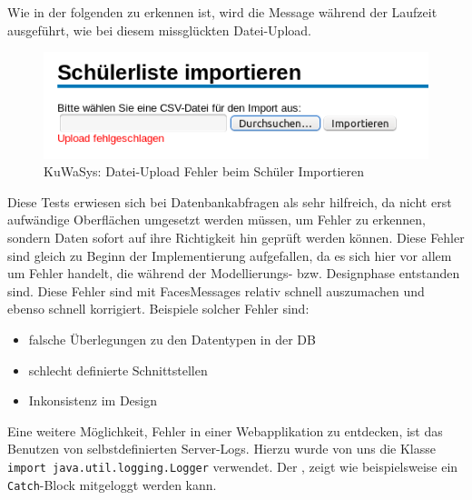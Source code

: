 	
	
Wie in der folgenden  zu erkennen ist, wird die Message während der Laufzeit ausgeführt, wie bei diesem missglückten Datei-Upload.

\begin{figure}[H]
 \begin{center}
   \includegraphics[scale=0.8]{img/SchulerImportieren_KuWaSys.png}
 \end{center}
 \caption[\textbf{KuWaSys: Datei-Upload Fehler beim Schüler Importieren}]{KuWaSys: Datei-Upload Fehler beim Schüler Importieren}
 \label{figmin:SchulerImportieren_KuWaSys}
 \label{fig:SchulerImportieren_KuWaSys}
\end{figure}

Diese Tests erwiesen sich bei Datenbankabfragen als sehr hilfreich, da nicht erst aufwändige Oberflächen umgesetzt werden müssen, um Fehler zu erkennen, sondern Daten sofort auf ihre Richtigkeit hin geprüft werden können.
Diese Fehler sind gleich zu Beginn der Implementierung aufgefallen, da es sich hier vor allem um Fehler handelt, die während der Modellierungs- bzw. Designphase entstanden sind. Diese Fehler sind mit FacesMessages relativ schnell auszumachen und ebenso schnell korrigiert. Beispiele solcher Fehler sind:
\begin{itemize}
  \item falsche Überlegungen zu den Datentypen in der \ac{DB}
  \item schlecht definierte Schnittstellen
  \item Inkonsistenz im Design 
\end{itemize}

Eine weitere Möglichkeit, Fehler in einer Webapplikation zu entdecken, ist das Benutzen von selbstdefinierten Server-Logs.
Hierzu wurde von uns die Klasse \texttt{import java.util.logging.Logger} verwendet. Der , zeigt wie beispielsweise ein \texttt{Catch}-Block  mitgeloggt werden kann.

